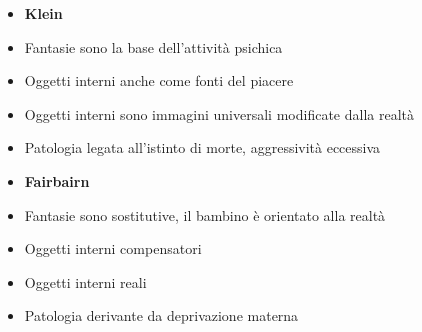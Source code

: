 \documentclass[12pt, a4paper]{article}
\begin{document}
\begin{minipage}{.45\textwidth}
    \begin{flushleft}
        \begin{itemize}
            \item \textbf{Klein}
            \item Fantasie sono la base dell'attivit\`a psichica
            \item Oggetti interni anche come fonti del piacere
            \item Oggetti interni sono immagini universali modificate dalla realt\`a
            \item Patologia legata all'istinto di morte, aggressivit\`a eccessiva
        \end{itemize}
    \end{flushleft}
\end{minipage}
\begin{minipage}{.45\textwidth}
    \begin{flushright}
    \begin{itemize}
        \item \textbf{Fairbairn}
        \item Fantasie sono sostitutive, il bambino \`e orientato alla realt\`a
        \item Oggetti interni compensatori
        \item Oggetti interni reali
        \item Patologia derivante da deprivazione materna
    \end{itemize}
    \end{flushright}
\end{minipage}
\end{document}
